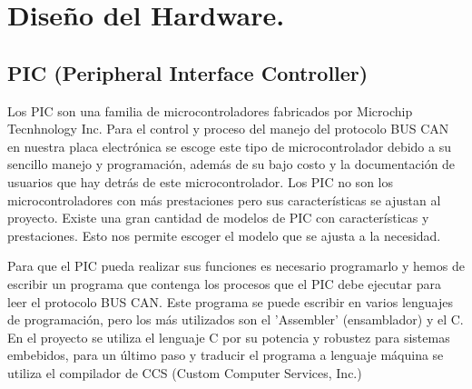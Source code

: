 \chapter[Capítulo 4. Diseño del Hardware ]{Diseño del Hardware.}

\section{PIC (Peripheral Interface Controller)}

Los PIC son una familia de microcontroladores  fabricados por Microchip Tecnhnology Inc. Para el control y proceso del manejo del protocolo BUS CAN en nuestra placa electrónica se escoge este tipo de microcontrolador debido a su sencillo manejo y programación, además de su bajo costo y la documentación de usuarios que hay detrás de este microcontrolador. Los PIC no son los microcontroladores con más prestaciones pero sus características se ajustan al proyecto. Existe una gran cantidad de modelos de PIC con características y prestaciones. Esto nos permite escoger el modelo que se ajusta a la necesidad. 

Para que el PIC pueda realizar sus funciones es necesario programarlo y hemos de escribir un programa que contenga los procesos que el PIC debe ejecutar para leer el protocolo BUS CAN. Este programa se puede escribir en varios lenguajes de programación, pero los  más utilizados son el ’Assembler’ (ensamblador) y el C. En el proyecto se utiliza el lenguaje C por su potencia y robustez para sistemas embebidos, para un último paso y traducir el programa a lenguaje máquina se utiliza el compilador  de CCS (Custom Computer Services, Inc.)

